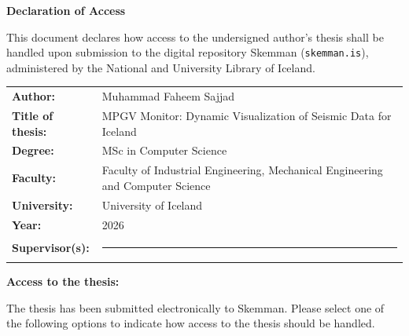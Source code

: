 \documentclass[12pt,a4paper]{article}
\newcommand{\formrule}[1][6cm]{\rule{#1}{0.4pt}}
\begin{document}
\begin{center}
    {\Large\bfseries Declaration of Access}
\end{center}

\vspace{1.5em}

\noindent
This document declares how access to the undersigned author's
thesis shall be handled upon submission to the digital repository
Skemman (\texttt{skemman.is}), administered by the National and
University Library of Iceland.

\vspace{1.8em}

\begin{tabular}{@{}p{4cm} p{10.2cm}@{}}
    \textbf{Author:}              & Muhammad Faheem Sajjad \\[0.8em]
    \textbf{Title of thesis:}     & MPGV Monitor: Dynamic Visualization of
                                    Seismic Data for Iceland \\[0.8em]
    \textbf{Degree:}              & MSc in Computer Science \\[0.8em]
    \textbf{Faculty:}             & Faculty of Industrial Engineering, Mechanical
                                    Engineering and Computer Science \\[0.8em]
    \textbf{University:}          & University of Iceland \\[0.8em]
    \textbf{Year:}                & 2026 \\[0.8em]
    \textbf{Supervisor(s):}       & \formrule[9cm] \\
\end{tabular}

\vspace{1.8em}

\noindent
\textbf{Access to the thesis:}

\vspace{0.3em}

\noindent
The thesis has been submitted electronically to Skemman.
Please select one of the following options to indicate how
access to the thesis should be handled.

\vspace{0.8em}
\end{document}

